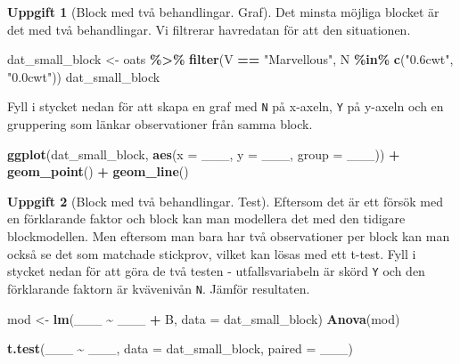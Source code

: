 \documentclass[
]{book}
\newenvironment{Shaded}{\begin{snugshade}}{\end{snugshade}}
\newcommand{\AttributeTok}[1]{\textcolor[rgb]{0.13,0.29,0.53}{#1}}
\newcommand{\FunctionTok}[1]{\textcolor[rgb]{0.13,0.29,0.53}{\textbf{#1}}}
\newcommand{\NormalTok}[1]{#1}
\newcommand{\OtherTok}[1]{\textcolor[rgb]{0.56,0.35,0.01}{#1}}
\newcommand{\SpecialCharTok}[1]{\textcolor[rgb]{0.81,0.36,0.00}{\textbf{#1}}}
\newcommand{\StringTok}[1]{\textcolor[rgb]{0.31,0.60,0.02}{#1}}
\theoremstyle{definition}
\theoremstyle{definition}
\theoremstyle{definition}
\newtheorem{exercise}{Uppgift}[chapter]
\theoremstyle{definition}
\theoremstyle{remark}
\begin{document}
\begin{exercise}[Block med två behandlingar. Graf]

Det minsta möjliga blocket är det med två behandlingar. Vi filtrerar havredatan för att den situationen.

\begin{Shaded}
\begin{Highlighting}[]
\NormalTok{dat\_small\_block }\OtherTok{\textless{}{-}}\NormalTok{ oats }\SpecialCharTok{\%\textgreater{}\%} 
  \FunctionTok{filter}\NormalTok{(V }\SpecialCharTok{==} \StringTok{"Marvellous"}\NormalTok{, N }\SpecialCharTok{\%in\%} \FunctionTok{c}\NormalTok{(}\StringTok{"0.6cwt"}\NormalTok{, }\StringTok{"0.0cwt"}\NormalTok{))}
\NormalTok{dat\_small\_block}
\end{Highlighting}
\end{Shaded}

Fyll i stycket nedan för att skapa en graf med \texttt{N} på x-axeln, \texttt{Y} på y-axeln och en gruppering som länkar observationer från samma block.

\begin{Shaded}
\begin{Highlighting}[]
\FunctionTok{ggplot}\NormalTok{(dat\_small\_block, }\FunctionTok{aes}\NormalTok{(}\AttributeTok{x =}\NormalTok{ \_\_\_, }\AttributeTok{y =}\NormalTok{ \_\_\_, }\AttributeTok{group =}\NormalTok{ \_\_\_)) }\SpecialCharTok{+}
  \FunctionTok{geom\_point}\NormalTok{() }\SpecialCharTok{+}
  \FunctionTok{geom\_line}\NormalTok{()}
\end{Highlighting}
\end{Shaded}

\end{exercise}

\begin{exercise}[Block med två behandlingar. Test]

Eftersom det är ett försök med en förklarande faktor och block kan man modellera det med den tidigare blockmodellen. Men eftersom man bara har två observationer per block kan man också se det som matchade stickprov, vilket kan lösas med ett t-test. Fyll i stycket nedan för att göra de två testen - utfallsvariabeln är skörd \texttt{Y} och den förklarande faktorn är kvävenivån \texttt{N}. Jämför resultaten.

\begin{Shaded}
\begin{Highlighting}[]
\NormalTok{mod }\OtherTok{\textless{}{-}} \FunctionTok{lm}\NormalTok{(\_\_\_ }\SpecialCharTok{\textasciitilde{}}\NormalTok{ \_\_\_ }\SpecialCharTok{+}\NormalTok{ B, }\AttributeTok{data =}\NormalTok{ dat\_small\_block)}
\FunctionTok{Anova}\NormalTok{(mod)}

\FunctionTok{t.test}\NormalTok{(\_\_\_ }\SpecialCharTok{\textasciitilde{}}\NormalTok{ \_\_\_, }\AttributeTok{data =}\NormalTok{ dat\_small\_block, }\AttributeTok{paired =}\NormalTok{ \_\_\_)}
\end{Highlighting}
\end{Shaded}

\end{exercise}
\end{document}
